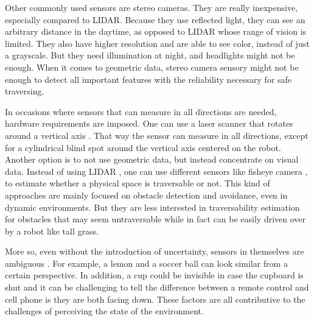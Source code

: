 \documentclass[12pt,a4paper]{report}
\newcommand{\acronym}{\MakeUppercase}
\begin{document}
	Other commonly used sensors are stereo cameras. They are really inexpensive, 
	especially compared to \acronym{lidar}. Because they use reflected light, they 
	can see an arbitrary distance in the daytime, as opposed to \acronym{lidar} 
	whose range of vision is limited. They also have higher resolution and are able 
	to see color, instead of just a grayscale. But they need illumination at night, 
	and headlights might not be enough. When it comes to geometric data, stereo 
	camera sensory might not be enough to detect all important features with the 
	reliability necessary for safe traversing.
	\par
	In occasions where sensors that can measure in all directions are needed, 
	hardware requirements are imposed. One can use a laser scanner that rotates 
	around a vertical axis \citep{Droeschel}. That way the sensor can measure in 
	all directions, except for a cylindrical blind spot around the vertical axis 
	centered on the robot.
	\\
	
	Another option is to not use geometric data, but instead concentrate on visual 
	data. Instead of using \acronym{lidar} \citep{Suger, Lalonde}, one can use 
	different sensors like fisheye camera \citep{Hirose, HiroseGonet}, 
	to estimate whether a physical space is traversable or not. This kind of 
	approaches are mainly focused on obstacle detection and avoidance, even in 
	dynamic environments. But they are less interested in traversability 
	estimation for obstacles that may seem untraversable while in fact can be 
	easily driven over by a robot like tall grass.
	\par
	More so, even without the introduction of uncertainty, sensors in themselves are 
	ambiguous \citep{Shabbir}. For example, a lemon and a soccer ball can look 
	similar from a certain perspective. In addition, a cup could be invisible in case 
	the cupboard is shut and it can be challenging to tell the difference between a 
	remote control and cell phone is they are both facing down. These factors are all
	contributive to the challenges of perceiving the state of the environment.
	\\
	
\end{document}
